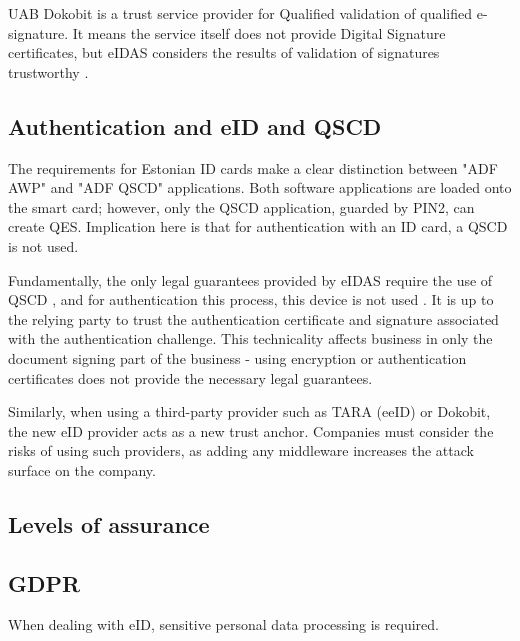 UAB Dokobit is a trust service provider for Qualified validation of qualified e-signature. It means the service itself does not provide Digital Signature certificates, but eIDAS considers the results of validation of signatures trustworthy \cite{eu-trustservices}.

\subsection{Authentication and eID and QSCD}


The requirements for Estonian ID cards make a clear distinction between "ADF AWP" and "ADF QSCD" applications. Both software applications are loaded onto the smart card; however, only the QSCD application, guarded by PIN2, can create QES. Implication here is that for authentication with an ID card, a QSCD is not used.

Fundamentally, the only legal guarantees provided by eIDAS require the use of QSCD \cite{eulaw-eidas}, and for authentication this process, this device is not used \cite{ee-id-tech}. It is up to the relying party to trust the authentication certificate and signature associated with the authentication challenge. This technicality affects business in only the document signing part of the business - using encryption or authentication certificates does not provide the necessary legal guarantees.

Similarly, when using a third-party provider such as TARA (eeID) or Dokobit, the new eID provider acts as a new trust anchor. Companies must consider the risks of using such providers, as adding any middleware increases the attack surface on the company.

\subsection{Levels of assurance}


\subsection{GDPR}

When dealing with eID, sensitive personal data processing is required.



